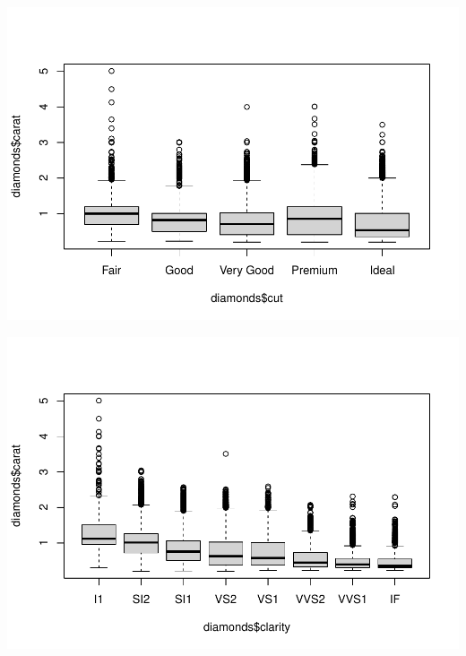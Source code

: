 \documentclass[
]{book}
\newenvironment{Shaded}{\begin{snugshade}}{\end{snugshade}}
\newcommand{\FunctionTok}[1]{\textcolor[rgb]{0.00,0.00,0.00}{#1}}
\newcommand{\NormalTok}[1]{#1}
\newcommand{\SpecialCharTok}[1]{\textcolor[rgb]{0.00,0.00,0.00}{#1}}
\begin{document}
\begin{Shaded}
\end{Shaded}

\includegraphics{13-MultipleLinearRegression_files/figure-latex/unnamed-chunk-6-1.pdf}

\begin{Shaded}
\end{Shaded}

\includegraphics{13-MultipleLinearRegression_files/figure-latex/unnamed-chunk-6-2.pdf}
\end{document}
